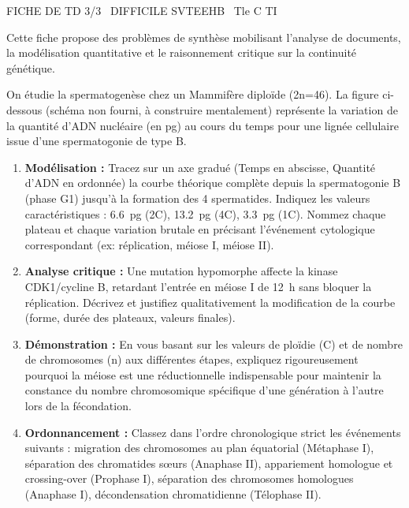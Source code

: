 \documentclass[11pt]{article}
\begin{document}
\begin{tcolorbox}[enhanced,colback=popink,colframe=popink,arc=10pt,boxrule=0pt,left=12pt,right=12pt,top=9pt,bottom=9pt]
{\color{white}\popxbold\small FICHE DE TD 3/3 \textbullet\ DIFFICILE \hfill SVTEEHB \textbullet\ Tle C TI\par}
\end{tcolorbox}
\vspace{4pt}
Cette fiche propose des problèmes de synthèse mobilisant l'analyse de documents, la modélisation quantitative et le raisonnement critique sur la continuité génétique.

\begin{exercice}
On étudie la spermatogenèse chez un Mammifère diploïde (2n=46). La figure ci-dessous (schéma non fourni, à construire mentalement) représente la variation de la quantité d'ADN nucléaire (en pg) au cours du temps pour une lignée cellulaire issue d'une spermatogonie de type B.
\begin{enumerate}
    \item \textbf{Modélisation :} Tracez sur un axe gradué (Temps en abscisse, Quantité d'ADN en ordonnée) la courbe théorique complète depuis la spermatogonie B (phase G1) jusqu'à la formation des 4 spermatides. Indiquez les valeurs caractéristiques : \SI{6,6}{pg} (2C), \SI{13,2}{pg} (4C), \SI{3,3}{pg} (1C). Nommez chaque plateau et chaque variation brutale en précisant l'événement cytologique correspondant (ex: réplication, méiose I, méiose II).
    \item \textbf{Analyse critique :} Une mutation hypomorphe affecte la kinase CDK1/cycline B, retardant l'entrée en méiose I de \SI{12}{h} sans bloquer la réplication. Décrivez et justifiez qualitativement la modification de la courbe (forme, durée des plateaux, valeurs finales).
    \item \textbf{Démonstration :} En vous basant sur les valeurs de ploïdie (C) et de nombre de chromosomes (n) aux différentes étapes, expliquez rigoureusement pourquoi la méiose est une \og réductionnelle \fg{} indispensable pour maintenir la constance du nombre chromosomique spécifique d'une génération à l'autre lors de la fécondation.
    \item \textbf{Ordonnancement :} Classez dans l'ordre chronologique strict les événements suivants : migration des chromosomes au plan équatorial (Métaphase I), séparation des chromatides sœurs (Anaphase II), appariement homologue et crossing-over (Prophase I), séparation des chromosomes homologues (Anaphase I), décondensation chromatidienne (Télophase II).
\end{enumerate}
\end{exercice}
\end{document}

